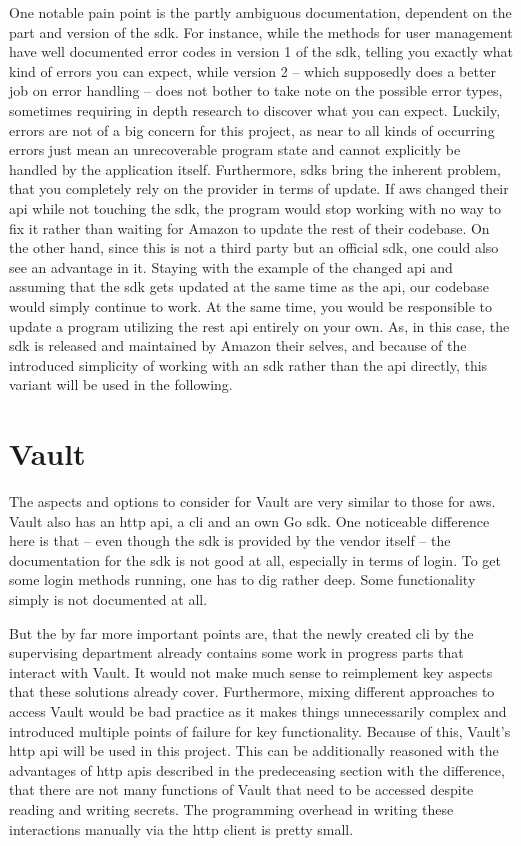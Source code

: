 One notable pain point is the partly ambiguous documentation, dependent on the part and version of the \ac{sdk}.
For instance, while the methods for user management have well documented error codes in version 1 of the \ac{sdk}, telling you exactly what kind of errors you can expect, while version 2 -- which supposedly does a better job on error handling -- does not bother to take note on the possible error types, sometimes requiring in depth research to discover what you can expect.
Luckily, errors are not of a big concern for this project, as near to all kinds of occurring errors just mean an unrecoverable program state and cannot explicitly be handled by the application itself.
Furthermore, \acp{sdk} bring the inherent problem, that you completely rely on the provider in terms of update.
If \ac{aws} changed their \ac{api} while not touching the \ac{sdk}, the program would stop working with no way to fix it rather than waiting for Amazon to update the rest of their codebase.
On the other hand, since this is not a third party but an official \ac{sdk}, one could also see an advantage in it.
Staying with the example of the changed \ac{api} and assuming that the \ac{sdk} gets updated at the same time as the \ac{api}, our codebase would simply continue to work.
At the same time, you would be responsible to update a program utilizing the \acs{rest} \ac{api} entirely on your own.
As, in this case, the \ac{sdk} is released and maintained by Amazon their selves, and because of the introduced simplicity of working with an \ac{sdk} rather than the \ac{api} directly, this variant will be used in the following.

\section{Vault}
The aspects and options to consider for Vault are very similar to those for \ac{aws}.
Vault also has an \ac{http} api, a \ac{cli} and an own Go \ac{sdk}.
One noticeable difference here is that -- even though the \ac{sdk} is provided by the vendor itself -- the documentation for the \ac{sdk} is not good at all, especially in terms of login.
To get some login methods running, one has to dig rather deep.
Some functionality simply is not documented at all.

But the by far more important points are, that the newly created \ac{cli} by the supervising department already contains some work in progress parts that interact with Vault.
It would not make much sense to reimplement key aspects that these solutions already cover.
Furthermore, mixing different approaches to access Vault would be bad practice as it makes things unnecessarily complex and introduced multiple points of failure for key functionality.
Because of this, Vault's \ac{http} \ac{api} will be used in this project.
This can be additionally reasoned with the advantages of \ac{http} \acp{api} described in the predeceasing section with the difference, that there are not many functions of Vault that need to be accessed despite reading and writing secrets.
The programming overhead in writing these interactions manually via the \ac{http} client is pretty small.

